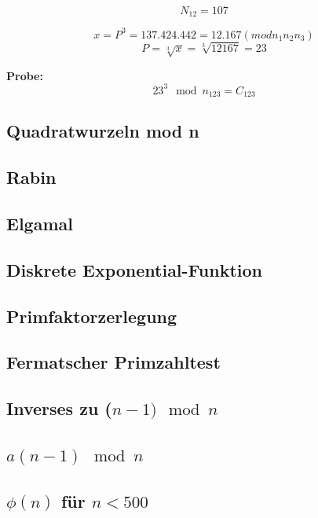 $$N_{12}= 107$$
	
\begin{equation}
	x = P^3 = 137.424.442 = 12.167 (mod n_{1}n_{2}n_{3})
\end{equation}
\begin{equation}
P=  \sqrt[3]{x} = \sqrt[3]{12167} = 23
\end{equation}

\textbf{Probe:}
\begin{equation}
23^3 \mod n_{123} = C_{123}
\end{equation}

\subsubsection{}

\subsection{Quadratwurzeln mod n}
\subsection{Rabin}
\subsection{Elgamal}
\subsection{Diskrete Exponential-Funktion}
\subsection{Primfaktorzerlegung}
\subsection{Fermatscher Primzahltest}
\subsection{Inverses zu ($n-1) \mod n$}
\subsection{$a(n-1) \mod n$}
\subsection{$\phi(n)$ für $n < 500$}

